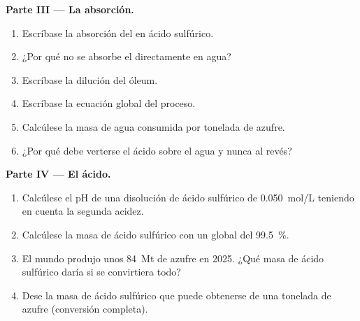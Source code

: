 \begin{problem}
\medskip
\noindent\textbf{Parte III --- La absorción.}
\begin{enumerate}[resume]
  \item Escríbase la absorción del  en ácido sulfúrico.
  \item ¿Por qué no se absorbe el  directamente en agua?
  \item Escríbase la dilución del óleum.
  \item Escríbase la ecuación global del proceso.
  \item Calcúlese la masa de agua consumida por tonelada de azufre.
  \item ¿Por qué debe verterse el ácido sobre el agua y nunca al revés?
\end{enumerate}

\medskip
\noindent\textbf{Parte IV --- El ácido.}
\begin{enumerate}[resume]
  \item Calcúlese el pH de una disolución de ácido sulfúrico de
        \qty{0.050}{mol/L} teniendo en cuenta la segunda acidez.
  \item Calcúlese la masa de ácido sulfúrico con un  global
        del \qty{99.5}{\percent}.
  \item El mundo produjo unos \qty{84}{Mt} de azufre en 2025. ¿Qué masa de
        ácido sulfúrico daría si se convirtiera todo?
  \item Dese la masa de ácido sulfúrico que puede obtenerse de una
        tonelada de azufre (conversión completa).
\end{enumerate}
\end{problem}

